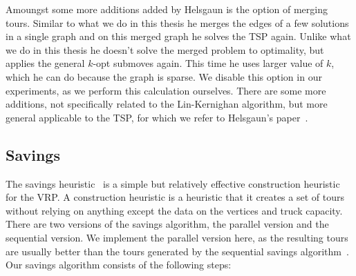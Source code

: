 \documentclass[titlepage, 12pt]{article}
\begin{document}
    Amoungst some more additions added by Helsgaun is the option of merging tours.
    Similar to what we do in this thesis he merges the edges of a few solutions in a single graph
    and on this merged graph he solves the TSP again.
    Unlike what we do in this thesis he doesn't solve the merged problem to optimality, but applies
    the general $k$-opt submoves again. This time he uses larger value of $k$, which he can do
    because the graph is sparse. We disable this option in our experiments, as we perform this
    calculation ourselves.
    There are some more additions, not specifically related to the Lin-Kernighan algorithm, but more
    general applicable to the TSP, for which we refer to Helsgaun's paper~\cite{lkh2}.


    \subsection{Savings}
    \label{sec:savings}
    The savings heuristic~\cite{savings} is a simple but relatively effective construction heuristic
    for the VRP\@. A construction heuristic is a heuristic that it creates a set of tours without
    relying on anything except the data on the vertices and truck capacity. There are two versions
    of the savings algorithm, the parallel version and the sequential version. We implement the
    parallel version here, as the resulting tours are usually better than the tours generated by the
    sequential savings algorithm~\cite{vrp-summary-1, vrp-summary-2}.
    Our savings algorithm consists of the following steps:
\end{document}
